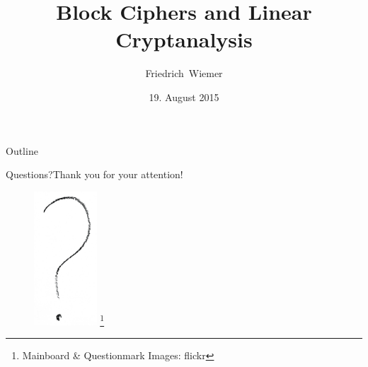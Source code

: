 \documentclass[12pt, dvisvgm]{beamer}
\title{Block Ciphers and Linear Cryptanalysis}
\subtitle{}
\author[Friedrich~Wiemer]{Friedrich~Wiemer}
\institute{%
	FluxFingers\\
	Ruhr University Bochum
}
\date{19. August 2015}
\newcommand{\blfootnote}[1]{%
	\begingroup
	\renewcommand\thefootnote{}\footnote{#1}%
	\addtocounter{footnote}{-1}%
	\endgroup
}
\begin{document}
\begin{frame}
	\titlepage{}
\end{frame}

\begin{frame}{Outline}
	\tableofcontents
\end{frame}



\begin{frame}{Questions?}{Thank you for your attention!}
	\begin{figure}[!htb]
		\includegraphics[height=50mm]{data/flickr/questionmark.png}\blfootnote{\scriptsize Mainboard \& Questionmark Images: flickr}
	\end{figure}
\end{frame}
\end{document}
